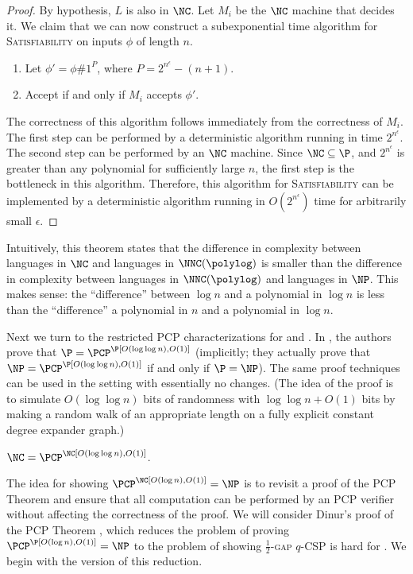 \documentclass{article}
\newcommand{\loglog}{\log \log}
\begin{document}
\begin{proof}
  By hypothesis, $L$ is also in $\NC$.
  Let $M_i$ be the $\NC$ machine that decides it.
  We claim that we can now construct a subexponential time algorithm for \textsc{Satisfiability} on inputs $\phi$ of length $n$.
  \begin{enumerate}
  \item Let $\phi' = \phi \# 1^P$, where $P = 2^{n^\epsilon} - (n + 1)$.
  \item Accept if and only if $M_i$ accepts $\phi'$.
  \end{enumerate}
  The correctness of this algorithm follows immediately from the correctness of $M_i$.
  The first step can be performed by a deterministic algorithm running in time $2^{n^\epsilon}$.
  The second step can be performed by an $\NC$ machine.
  Since $\NC \subseteq \P$, and $2^{n^\epsilon}$ is greater than any polynomial for sufficiently large $n$, the first step is the bottleneck in this algorithm.
  Therefore, this algorithm for \textsc{Satisfiability} can be implemented by a deterministic algorithm running in $O(2^{n^\epsilon})$ time for arbitrarily small $\epsilon$.
\end{proof}

Intuitively, this theorem states that the difference in complexity between languages in $\NC$ and languages in $\NNC(\polylog)$ is smaller than the difference in complexity between languages in $\NNC(\polylog)$ and languages in $\NP$.
This makes sense: the ``difference'' between $\log n$ and a polynomial in $\log n$ is less than the ``difference'' a polynomial in $n$ and a polynomial in $\log n$.

Next we turn to the restricted PCP characterizations for \NC{} and \NP{}.
In \cite{fs96}, the authors prove that $\P = \PCP^\P[O(\loglog n), O(1)]$ (implicitly; they actually prove that $\NP = \PCP^\P[O(\loglog n), O(1)]$ if and only if $\P = \NP$).
The same proof techniques can be used in the \NC{} setting with essentially no changes.
(The idea of the proof is to simulate $O(\loglog n)$ bits of randomness with $\loglog n + O(1)$ bits by making a random walk of an appropriate length on a fully explicit constant degree expander graph.)

\begin{theorem}\label{thm:ncpcp}
  $\NC = \PCP^\NC[O(\loglog n), O(1)]$.
\end{theorem}

The idea for showing $\PCP^\NC[O(\log n), O(1)] = \NP$ is to revisit a proof of the PCP Theorem and ensure that all computation can be performed by an \NC{} PCP verifier without affecting the correctness of the proof.
We will consider Dinur's proof of the PCP Theorem \cite{dinur07}, which reduces the problem of proving $\PCP^\P[O(\log n), O(1)] = \NP$ to the problem of showing \textsc{$\frac{1}{2}$-gap $q$-CSP} is hard for \NP.
We begin with the \NC{} version of this reduction.
\end{document}

